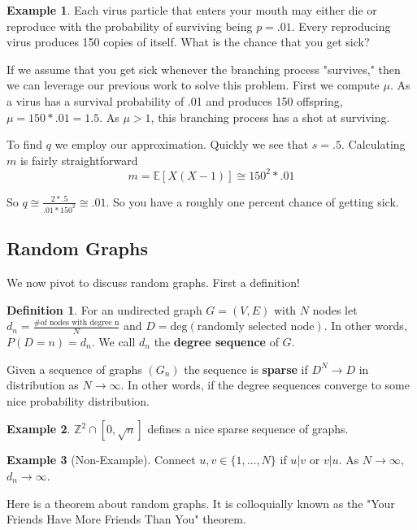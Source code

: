 \documentclass{article}
\theoremstyle{definition}
\newtheorem{example}{Example}
\newtheorem{definition}{Definition}
\begin{document}
\begin{example} Each virus particle that enters your mouth may either die or reproduce with the probability of surviving being $p = .01$. Every reproducing virus produces 150 copies of itself. What is the chance that you get sick? 

If we assume that you get sick whenever the branching process "survives," then we can leverage our previous work to solve this problem. First we compute $\mu$. As a virus has a survival probability of .01 and produces 150 offspring, $\mu = 150*.01 = 1.5$. As $\mu > 1$, this branching process has a shot at surviving. 

To find $q$ we employ our approximation. Quickly we see that $s = .5$. Calculating $m$ is fairly straightforward
\[m = \mathbb{E}[X(X-1)] \cong 150^2*.01\]

So $q \cong \frac{2*.5}{.01*150^2} \cong .01$. So you have a roughly one percent chance of getting sick. 
\end{example}

\subsection{Random Graphs}

We now pivot to discuss random graphs. First a definition!

\begin{definition} For an undirected graph $G = (V,E)$ with $N$ nodes let $d_n = \frac{\text{\# of nodes with degree n}}{N}$ and $D = \text{deg}(\text{randomly selected node})$. In other words, $P(D = n) = d_n$. We call $d_n$ the \textbf{degree sequence} of $G$. 

Given a sequence of graphs $(G_n)$ the sequence is \textbf{sparse} if $D^N \rightarrow D$ in distribution as $N \rightarrow \infty$. In other words, if the degree sequences converge to some nice probability distribution.
\end{definition}

\begin{example} $\mathbb{Z}^2 \cap [0,\sqrt{n}]$ defines a nice sparse sequence of graphs.
\end{example}

\begin{example}[Non-Example] Connect $u, v \in \lbrace 1,\dots,N\rbrace$ if $u|v$ or $v|u$. As $N \rightarrow \infty$, $d_n \rightarrow \infty$. 
\end{example}

Here is a theorem about random graphs. It is colloquially known as the "Your Friends Have More Friends Than You" theorem.
\end{document}
